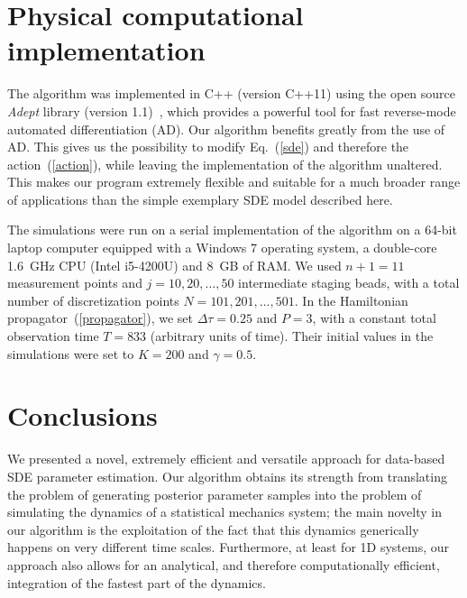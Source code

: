 \documentclass[11pt]{article}
\theoremstyle{definition}
\begin{document}
\section{Physical computational implementation}

The algorithm was implemented in C++ (version C++11) using the open source \emph{Adept} library (version 1.1)~\cite{Hogan_2014_adept}, which provides a powerful tool for fast reverse-mode automated differentiation (AD). Our algorithm benefits greatly from the use of AD. This gives us the possibility to modify Eq.~(\ref{sde}) and therefore the action~(\ref{action}), while leaving the implementation of the algorithm unaltered. This makes our program extremely flexible and suitable for a much broader range of applications than the simple exemplary SDE model described here.
%

The simulations were run on a serial implementation of the algorithm on a 64-bit laptop computer equipped with a Windows 7 operating system, a double-core 1.6~GHz CPU (Intel i5-4200U) and 8~GB of RAM. We used $n+1 = 11$ measurement points and $j = 10, 20,\dots, 50$ intermediate staging beads, with a total number of discretization points $N = 101, 201, \dots, 501$. In the Hamiltonian propagator~(\ref{propagator}), we set $\Delta\tau = 0.25$ and $P = 3$, with a constant total observation time $T = 833$ (arbitrary units of time).  Their initial values in the simulations were set to $K=200$ and $\gamma = 0.5$.
%




\section{Conclusions}

We presented a novel, extremely efficient and versatile approach for data-based SDE parameter estimation.
Our algorithm obtains its strength from translating the problem of generating posterior parameter samples into the problem of simulating the dynamics of a statistical mechanics system;
the main novelty in our algorithm is the exploitation of the fact that this dynamics generically happens on very different time scales.
Furthermore, at least for 1D systems, our approach also allows for an analytical, and therefore computationally efficient, integration of the fastest part of the dynamics.
\end{document}
